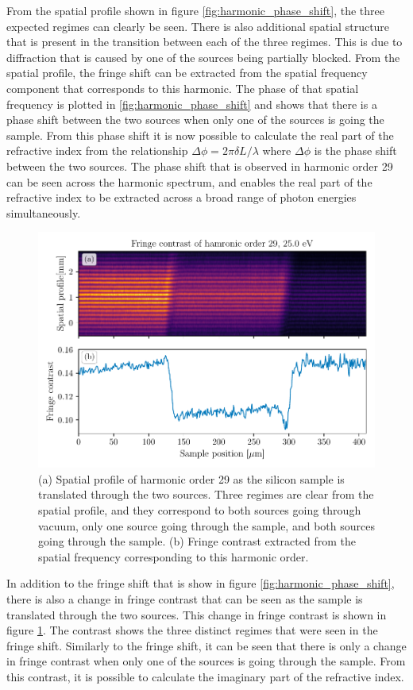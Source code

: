 From the spatial profile shown in figure \ref{fig:harmonic_phase_shift}, the three expected regimes can clearly be seen.  There is also additional spatial structure that is present in the transition between each of the three regimes.  This is due to diffraction that is caused by one of the sources being partially blocked.  From the spatial profile, the fringe shift can be extracted from the spatial frequency component that corresponds to this harmonic.  The phase of that spatial frequency is plotted in \ref{fig:harmonic_phase_shift} and shows that there is a phase shift between the two sources when only one of the sources is going the sample.  From this phase shift it is now possible to calculate the real part of the refractive index from the relationship $\Delta \phi = 2\pi\delta L/\lambda$ where $\Delta \phi$ is the phase shift between the two sources.  The phase shift that is observed in harmonic order 29 can be seen across the harmonic spectrum, and enables the real part of the refractive index to be extracted across a broad range of photon energies simultaneously.

\begin{figure}
	\centering
	\includegraphics[width=1.0\textwidth]{figures/refractive_index/spatialgram_fringe_contrast.pdf}
	\caption{(a) Spatial profile of harmonic order 29 as the silicon sample is translated through the two sources. Three regimes are clear from the spatial profile, and they correspond to both sources going through vacuum, only one source going through the sample, and both sources going through the sample. (b) Fringe contrast extracted from the spatial frequency corresponding to this harmonic order.}
	\label{fig:harmonic_fringe_contrast}
\end{figure}
In addition to the fringe shift that is show in figure \ref{fig:harmonic_phase_shift}, there is also a change in fringe contrast that can be seen as the sample is translated through the two sources.  This change in fringe contrast is shown in figure \ref{fig:harmonic_fringe_contrast}.  The contrast shows the three distinct regimes that were seen in the fringe shift.  Similarly to the fringe shift, it can be seen that there is only a change in fringe contrast when only one of the sources is going through the sample.  From this contrast, it is possible to calculate the imaginary part of the refractive index. 

